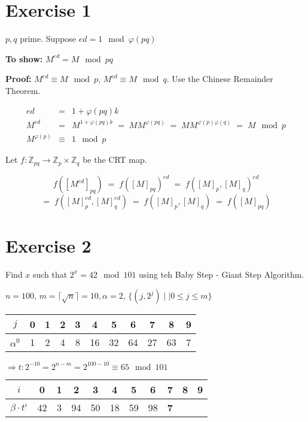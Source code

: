 \documentclass[a4paper]{scrreprt}
\newcommand\Z{\mathbb Z}
\begin{document}
\section*{Exercise 1}

$p,q$ prime. Suppose $ed=1\mod\varphi(pq)$

\textbf{To show:} $M^{ed}=M\mod pq$

\textbf{Proof:} $M^{ed}\equiv M\mod p$, $M^{ed}\equiv M\mod q$. Use the Chinese Remainder Theorem.

\begin{eqnarray*}
    ed &=& 1 +\varphi(pq)k \\
    M^{ed} &=& M^{1+\varphi(pq)k} \;=\; MM^{\varphi(pq)} \;=\; MM^{\varphi(p)\varphi(q)} \;=\;M\mod p\\ 
    M^{\varphi(p)} &\equiv& 1\mod p
\end{eqnarray*}

Let $f:\Z_{pq}\rightarrow \Z_p\times\Z_q$ be the CRT map.

\[f([M^{ed}]_{pq}) \;=\; f([M]_{pq})^{ed} \;=\;f([M]_p,[M]_q)^{ed}\]
\[=\; f([M]_p^{ed}, [M]_q^{ed}) \;=\; f([M]_p, [M]_q) \;=\; f([M]_{pq})\]

\section*{Exercise 2}

Find $x$ such that $2^x=42\mod 101$ using teh Baby Step - Giant Step Algorithm.

$n=100$, $m=\lceil\sqrt n\rceil = 10, \alpha=2$, $\{(j, 2^j)\mid|0\leq j\leq m\}$

\begin{center}
    \begin{tabular}{c|c|c|c|c|c|c|c|c|c|c}
        $j$ & 0 & 1 & 2 & 3 & 4 & 5 & 6 & 7 & 8 & 9\\
        \hline
        $\alpha^0$ & 1 & 2 & 4 & 8 & 16 & 32 & 64 & 27 & 63 & 7
    \end{tabular}
\end{center}

$\Rightarrow t: 2^{-10}=2^{n-m}=2^{100-10}\equiv 65\mod 101$

\begin{center}
    \begin{tabular}{c|c|c|c|c|c|c|c|c|c|c}
        $i$ & 0 & 1 & 2 & 3 & 4 & 5 & 6 & 7 & 8 & 9\\
        \hline
        $\beta\cdot t^i$ & 42 & 3 & 94 & 50 & 18 & 59 & 98 & \textbf{7} & &
    \end{tabular}
\end{center}
\end{document}
